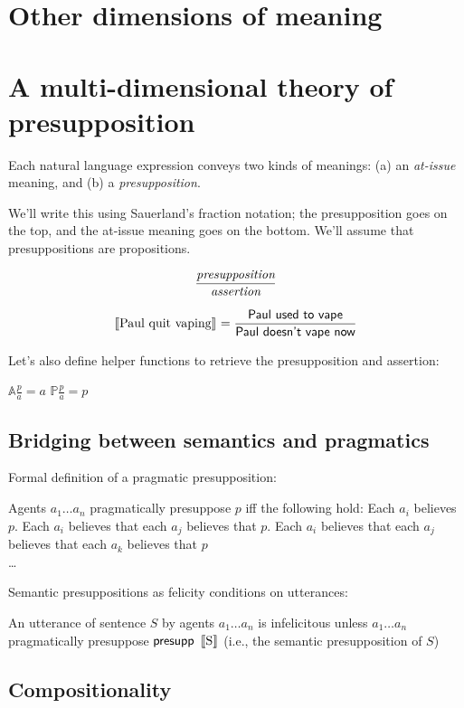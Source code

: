 \documentclass[cronos,landscape,paper=letter]{ling-handout}
\begin{document}
\section{Other dimensions of meaning}

\section{A multi-dimensional theory of presupposition}

Each natural language expression conveys two kinds of meanings: (a) an \textit{at-issue} meaning, and (b) a \textit{presupposition}.

We'll write this using Sauerland's fraction notation; the presupposition goes on the top, and the at-issue meaning goes on the bottom. We'll assume that presuppositions are propositions.

\[\displaystyle\frac{\text{\it presupposition}}{\text{\it assertion}}\]

\[\eval{Paul quit vaping}= \displaystyle\frac{\ml{Paul used to vape}}{\ml{Paul doesn't vape now}}\]

Let's also define helper functions to retrieve the presupposition and assertion:

\begin{multicols}{2}
\ex
\(𝔸 \displaystyle\frac{p}{a} = a\)
\xe
\columnbreak
\ex
\(ℙ \displaystyle\frac{p}{a} = p\)
\xe
\end{multicols}

\subsection{Bridging between semantics and pragmatics}

Formal definition of a pragmatic presupposition:

\pex
Agents \(a_{1} … a_{n}\) pragmatically presuppose \(p\) iff the following hold:
\a Each \(a_{i}\) believes \(p\).
\a Each \(a_{i}\) believes that each \(a_{j}\) believes that \(p\).
\a Each \(a_{i}\) believes that each \(a_{j}\) believes that each \(a_{k}\) believes that \(p\)\\
\ldots
\xe

Semantic presuppositions as felicity conditions on utterances:

\ex
An utterance of sentence \(S\) by agents \(a_{1}…a_{n}\) is infelicitous unless \(a_{1}…a_{n}\) pragmatically presuppose \(\ml{presupp} \eval{S}\) (i.e., the semantic presupposition of \(S\))
\xe

\subsection{Compositionality}
\end{document}
